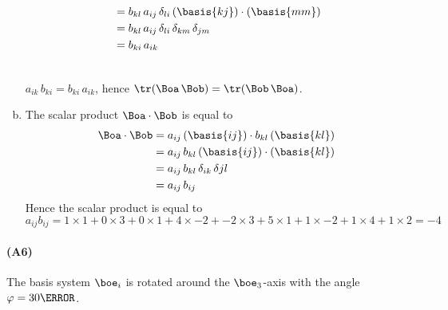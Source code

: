 \documentclass[a4paper,twosided,11pt,DIV15]{scrartcl}
\begin{document}
\begin{enumerate}[(a)]
\begin{minipage}{0.5\textwidth}
\begin{align*}
    &= b_{kl}\,a_{ij}\,\delta_{li}\,(\basis{kj})\cdot(\basis{mm})\\
    &= b_{kl}\,a_{ij}\,\delta_{li}\,\delta_{km}\,\delta_{jm}\\
    &= b_{ki}\,a_{ik}
  \end{align*}
\end{minipage}
\\[1em] $a_{ik}\,b_{ki}=b_{ki}\,a_{ik}$, hence $\tr(\Boa\,\Bob)=\tr(\Bob\,\Boa)$.
\item The scalar product $\Boa\cdot\Bob$ is equal to
\begin{align*}
  \Boa\cdot\Bob&=a_{ij}\,(\basis{ij})\cdot b_{kl}\,(\basis{kl})  \\
  &=a_{ij}\,b_{kl}\,(\basis{ij})\cdot(\basis{kl})  \\
  &=a_{ij}\,b_{kl}\,\delta_{ik}\,\delta{jl} \\
  &=a_{ij}\,b_{ij}
\end{align*}
Hence the scalar product is equal to
$$a_{ij}b_{ij}=1\times 1+0\times 3+0\times 1+4\times -2+-2\times 3+5\times 1+1\times -2+1\times 4+1\times 2=-4$$
\end{enumerate}

\newcommand{\boea}{\overset{*}{\boe}}

\paragraph{(A6)} The basis system $\boe_i$ is rotated around the
$\boe_3$-axis with the angle $\varphi=30\degree$.
\end{document}
